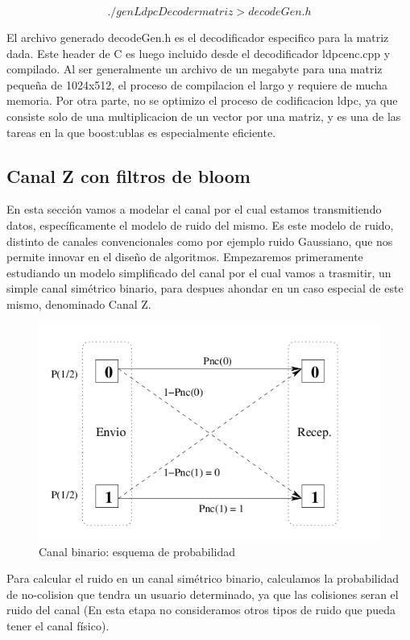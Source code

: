 \documentclass[a4paper,10pt]{report}
\begin{document}
$$ ./genLdpcDecoder matriz  > decodeGen.h $$

El archivo generado decodeGen.h es el decodificador especifico para la matriz dada. Este header de C es luego incluido desde el decodificador ldpcenc.cpp y compilado. Al ser generalmente un archivo de un megabyte para una matriz pequeña de 1024x512, el proceso de compilacion el largo y requiere de mucha memoria.
Por otra parte, no se optimizo el proceso de codificacion ldpc, ya que consiste solo de una multiplicacion de un vector por una matriz, y es una de las tareas en la que boost:ublas es especialmente eficiente.

\subsection{Canal Z con filtros de bloom}
En esta sección vamos a modelar el canal por el cual estamos transmitiendo datos, específicamente el modelo de ruido del mismo. Es este modelo de ruido, distinto de canales convencionales como por ejemplo ruido Gaussiano, que nos permite innovar en el diseño de algoritmos.
Empezaremos primeramente estudiando un modelo simplificado del canal por el cual vamos a trasmitir, un simple canal simétrico binario, para despues ahondar en un caso especial de este mismo, denominado Canal Z.
\begin{figure}[t]
  \begin{center}
    \includegraphics[scale=0.43]{capacidad/canalBinario.png}
  \end{center}
\caption {Canal binario: esquema de probabilidad}
\label{fig:canbin}
\end{figure}

Para calcular el ruido en un canal simétrico binario, calculamos la probabilidad de no-colision que tendra un usuario determinado, ya que las colisiones seran el ruido del canal (En esta etapa no consideramos otros tipos de ruido que pueda tener el canal físico).
\end{document}
